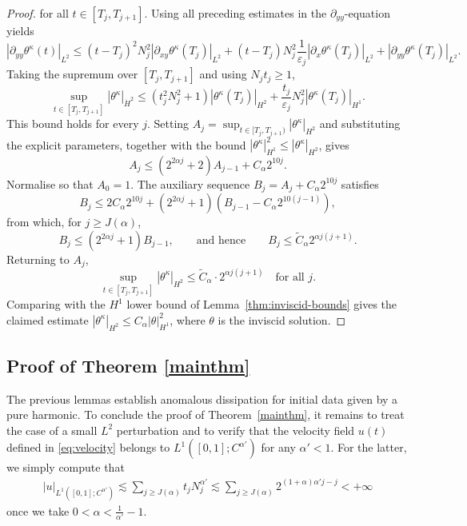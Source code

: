 \documentclass[12pt]{report}   %
\renewcommand{\le}{\leqslant}
\renewcommand{\ge}{\geqslant}
\numberwithin{equation}{section}
\theoremstyle{plain}
\theoremstyle{definition}
\theoremstyle{remark}
\newcommand{\eps}{{\varepsilon}}
\begin{document}
\begin{proof}
for all $t\in [T_j, T_{j+1}]$. Using all preceding estimates in the $\partial_{yy}$-equation yields
\[|\partial_{yy} \theta^\kappa(t)|_{L^2}\le (t-T_j)^2 N_j^2 |\partial_{xy}\theta^\kappa(T_j)|_{L^2}+(t-T_j)N_j^2\frac{1}{\eps_j}|\partial_x \theta^\kappa(T_j)|_{L^2}+|\partial_{yy} \theta^\kappa(T_j)|_{L^2}.\]
Taking the supremum over $[T_j, T_{j+1}]$ and using $N_j t_j\ge 1$,
\[\sup_{t\in [T_j, T_{j+1}]}|\theta^\kappa|_{\dot H^2}\le (t_j^2 N_j^2+1) |\theta^\kappa(T_j)|_{H^2}+\frac{t_j}{\eps_j}N_j^2|\theta^\kappa(T_j)|_{H^1}.\]
This bound holds for every $j$. Setting $A_j=\sup_{t\in [T_j, T_{j+1})}|\theta^\kappa|_{H^2}$ and substituting the explicit parameters, together with the bound $|\theta^\kappa|_{H^1}^2\le |\theta^\kappa|_{H^2}$, gives
\[A_j\le (2^{2{\alpha}j}+2)A_{j-1}+{C_\alpha} 2^{10j}.\]
Normalise so that $A_0=1$. The auxiliary sequence $B_j=A_j+C_\alpha 2^{10j}$ satisfies
\[B_{j}\le 2 C_\alpha 2^{10j}+(2^{2{\alpha}j}+1)(B_{j-1}-C_\alpha 2^{10(j-1)}),\]
from which, for $j\ge {J(\alpha)}$,
\[B_j\le (2^{2{\alpha}j}+1)B_{j-1}, \qquad \text{and hence} \qquad B_j \le \tilde C_\alpha 2^{\alpha j(j+1)}.\]
Returning to $A_j$,
\[\sup_{t\in [T_j, T_{j+1}]} |\theta^\kappa|_{H^2}\le \tilde C_\alpha \cdot 2^{{\alpha}j(j+1)} \quad \text{for all } j.\]
Comparing with the $H^1$ lower bound of Lemma~\ref{thm:inviscid-bounds} gives the claimed estimate $|\theta^\kappa|_{H^2}\le C_\alpha|\theta |_{H^1}^2$, where $\theta$ is the inviscid solution. \end{proof} 


\subsection{Proof of Theorem \ref{mainthm}}


The previous lemmas establish anomalous dissipation for initial data given by a pure harmonic. To conclude the proof of Theorem~\ref{mainthm}, it remains to treat the case of a small $L^2$ perturbation and to verify that the velocity field $u(t)$ defined in \eqref{eq:velocity} belongs to $L^1([0,1];C^{\alpha'})$ for any $\alpha'<1$. For the latter, we simply compute that \begin{equation*}
\begin{split}
|u|_{L^1([0,1];C^{\alpha'})} \lesssim \sum_{j \ge J(\alpha)} t_j N_j^{\alpha'} \lesssim \sum_{j \ge J(\alpha)} 2^{ (1+\alpha)\alpha'j -j } <+\infty 
\end{split}
\end{equation*} once we take $0<\alpha < \frac{1}{\alpha'} - 1$.
\end{document}
